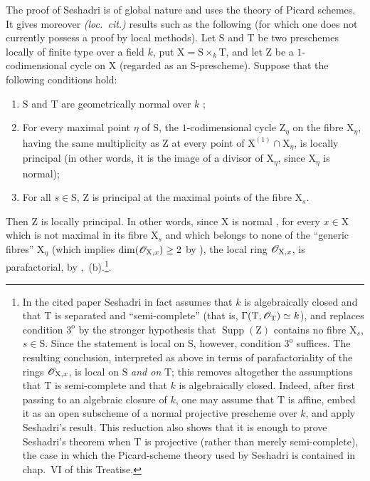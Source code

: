 \begin{env}[21.14.4]
The proof of Seshadri \cite[pp.~188--189]{IV-44} is of global nature and uses the theory of Picard schemes.
It gives moreover \emph{(loc.\ cit.)} results such as the following (for which one does not currently possess a proof by local methods).
Let $\mathrm{S}$ and $\mathrm{T}$ be two preschemes locally of finite type over a field $k$, put $\mathrm{X}=\mathrm{S}\times_k\mathrm{T}$, and let $\mathrm{Z}$ be a $1$-codimensional cycle on $\mathrm{X}$ (regarded as an $\mathrm{S}$-prescheme). Suppose that the following conditions hold:
\begin{enumerate}[label=\arabic*\textsuperscript{o}]
  \item $\mathrm{S}$ and $\mathrm{T}$ are geometrically normal over $k$ ;
  \item For every maximal point $\eta$ of $\mathrm{S}$, the $1$-codimensional cycle $\mathrm{Z}_\eta$ on the fibre $\mathrm{X}_\eta$, having the same multiplicity as $\mathrm{Z}$ at every point of $\mathrm{X}^{(1)}\cap\mathrm{X}_\eta$, is locally principal (in other words, it is the image of a divisor of $\mathrm{X}_\eta$, since $\mathrm{X}_\eta$ is normal);
  \item For all $s\in\mathrm{S}$, $\mathrm{Z}$ is principal at the maximal points of the fibre $\mathrm{X}_s$.
\end{enumerate}
Then $\mathrm{Z}$ is locally principal.
In other words, since $\mathrm{X}$ is normal , for every $x\in\mathrm{X}$ which is not maximal in its fibre $\mathrm{X}_s$ and which belongs to none of the ``generic fibres'' $\mathrm{X}_\eta$ (which implies $\dim(\mathscr{O}_{\mathrm{X},x})\geq2$ by ), the local ring $\mathscr{O}_{\mathrm{X},x}$, is parafactorial, by ,~(b).\footnote{In the cited paper Seshadri in fact assumes that $k$ is algebraically closed and that $\mathrm{T}$ is separated and ``semi-complete'' (that is, $\Gamma(\mathrm{T},\mathscr{O}_{\mathrm{T}})\simeq k$), and replaces condition $3^{\mathrm{o}}$ by the stronger hypothesis that $\operatorname{Supp}(\mathrm{Z})$ contains no fibre $\mathrm{X}_s$, $s\in\mathrm{S}$. Since the statement is local on $\mathrm{S}$, however, condition $3^{\mathrm{o}}$ suffices. The resulting conclusion, interpreted as above in terms of parafactoriality of the rings $\mathscr{O}_{\mathrm{X},x}$, is local on $\mathrm{S}$ \emph{and on} $\mathrm{T}$; this removes altogether the assumptions that $\mathrm{T}$ is semi-complete and that $k$ is algebraically closed. Indeed, after first passing to an algebraic closure of $k$, one may assume that $\mathrm{T}$ is affine, embed it as an open subscheme of a normal projective prescheme over $k$, and apply Seshadri's result. This reduction also shows that it is enough to prove Seshadri's theorem when $\mathrm{T}$ is projective (rather than merely semi-complete), the case in which the Picard-scheme theory used by Seshadri is contained in chap.~VI of this Treatise.}.
\end{env}

